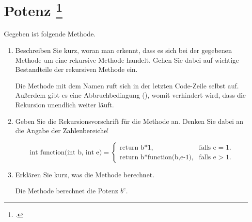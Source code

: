 \documentclass{lehramt-informatik-aufgabe}
\begin{document}

\section{Potenz
\footcite[Aufgabe 2: Rekursion, Seite 2]{aud:ab:1}}

Gegeben ist folgende Methode.

\begin{enumerate}


\item Beschreiben Sie kurz, woran man erkennt, dass es sich bei der
gegebenen Methode um eine rekursive Methode handelt. Gehen Sie dabei auf
wichtige Bestandteile der rekursiven Methode ein.

\begin{liAntwort}
Die Methode mit dem Namen  ruft sich in der letzten
Code-Zeile selbst auf. Außerdem gibt es eine Abbruchbedingung
(), womit verhindert wird, dass die
Rekursion unendlich weiter läuft.
\end{liAntwort}


\item Geben Sie die Rekursionsvorschrift für die Methode 
an. Denken Sie dabei an die Angabe der Zahlenbereiche!

\begin{liAntwort}
\begin{equation*}
\text{int function(int b, int e)} =
\begin{cases}
\text{return b*1}, & \text{falls e = 1}.\\
\text{return b*function(b,e-1)}, & \text{falls e > 1}.
\end{cases}
\end{equation*}
\end{liAntwort}


\item Erklären Sie kurz, was die Methode  berechnet.

\begin{liAntwort}
Die Methode  berechnet die Potenz $b^e$.
\end{liAntwort}
\end{enumerate}
\end{document}
